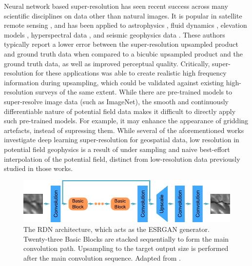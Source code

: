 Neural network based super-resolution has seen recent success across many scientific disciplines on data other than natural images.
It is popular in satellite remote sensing \parencite[e.g.][]{lanarasSuperresolutionSentinel2Images2018,wangUltradenseGANSatellite2019}, and has been applied to astrophysics \parencite[e.g.][]{jungbluthSingleframeSuperresolutionSolar2019,salvatelliUsingUNetsCreate2019}, fluid dynamics \parencite{bodeUsingPhysicsinformedEnhanced2021}, elevation models \parencite{leongDeepBedMapDeepNeural2020}, hyperspectral data \parencite[e.g.][]{arunCNNBasedSuperResolutionHyperspectral2020}, and seismic geophysics data \parencite[e.g.][]{liDeepLearningSimultaneous2021,wangDeeplearningbasedSeismicData2018,wangAdaptingResidualDense2022,yuDeepLearningDenoising2019}.
These authors typically report a lower error between the super-resolution upsampled product and ground truth data when compared to a bicubic upsampled product and the ground truth data, as well as improved perceptual quality.
Critically, super-resolution for these applications was able to create realistic high frequency information during upsampling, which could be validated against existing high-resolution surveys of the same extent.
While there are pre-trained models to super-resolve image data (such as ImageNet), the smooth and continuously differentiable nature of potential field data makes it difficult to directly apply such pre-trained models.
For example, it may enhance the appearance of gridding artefacts, instead of supressing them.
While several of the aforementioned works investigate deep learning super-resolution for geospatial data, low resolution in potential field geophysics is a result of under sampling and naive best-effort interpolation of the potential field, distinct from low-resolution data previously studied in those works.

\begin{figure}[hbtp]
    \centering
    \includegraphics[width=\linewidth]{fig/p1/rdn_vec.pdf}
    \caption[The RDN architecture]{The RDN architecture, which acts as the ESRGAN generator.
        Twenty-three Basic Blocks are stacked sequentially to form the main convolution path.
        Upsampling to the target output size is performed after the main convolution sequence.
        Adapted from \textcite{wangESRGANEnhancedSuperresolution2018}.
    }
    \label{fig:rdn}
\end{figure}


